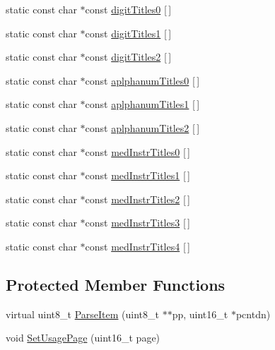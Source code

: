 \begin{DoxyCompactItemize}
\item 
static const char $\ast$const \hyperlink{class_report_desc_parser_base_a298396c59609fab20c2a5eedb3ca0b87}{digit\-Titles0} \mbox{[}$\,$\mbox{]}
\item 
static const char $\ast$const \hyperlink{class_report_desc_parser_base_abc5202f47578494d3f6008413f632873}{digit\-Titles1} \mbox{[}$\,$\mbox{]}
\item 
static const char $\ast$const \hyperlink{class_report_desc_parser_base_addaa9b5724f7d1ca10ba4ca14decd40d}{digit\-Titles2} \mbox{[}$\,$\mbox{]}
\item 
static const char $\ast$const \hyperlink{class_report_desc_parser_base_a5cd50b03ac2d022ca55e6a5bbd448ac8}{aplphanum\-Titles0} \mbox{[}$\,$\mbox{]}
\item 
static const char $\ast$const \hyperlink{class_report_desc_parser_base_afac5fab915e65babde2645e09b66e74f}{aplphanum\-Titles1} \mbox{[}$\,$\mbox{]}
\item 
static const char $\ast$const \hyperlink{class_report_desc_parser_base_ae0090afb0e090b539fcaa4b71f099b08}{aplphanum\-Titles2} \mbox{[}$\,$\mbox{]}
\item 
static const char $\ast$const \hyperlink{class_report_desc_parser_base_a3d8d0fa8512f718e8b574e4d9e8a775f}{med\-Instr\-Titles0} \mbox{[}$\,$\mbox{]}
\item 
static const char $\ast$const \hyperlink{class_report_desc_parser_base_a3e22173cfb0358f71357224f88ba7233}{med\-Instr\-Titles1} \mbox{[}$\,$\mbox{]}
\item 
static const char $\ast$const \hyperlink{class_report_desc_parser_base_aee85293ab9a08f5e348fe339f7e4e7e9}{med\-Instr\-Titles2} \mbox{[}$\,$\mbox{]}
\item 
static const char $\ast$const \hyperlink{class_report_desc_parser_base_a986eebc1d44ff6c7b2779c584640bfa8}{med\-Instr\-Titles3} \mbox{[}$\,$\mbox{]}
\item 
static const char $\ast$const \hyperlink{class_report_desc_parser_base_abf57eb862e09967eb05a234f81b4a9d4}{med\-Instr\-Titles4} \mbox{[}$\,$\mbox{]}
\end{DoxyCompactItemize}
\subsection*{\-Protected \-Member \-Functions}
\begin{DoxyCompactItemize}
\item 
virtual uint8\-\_\-t \hyperlink{class_report_desc_parser_base_ac1d6c015d9a2527bb2044e9a96fcaaf9}{\-Parse\-Item} (uint8\-\_\-t $\ast$$\ast$pp, uint16\-\_\-t $\ast$pcntdn)
\item 
void \hyperlink{class_report_desc_parser_base_a42fbc8fbccaf67eab88bd98b8d3bdd3f}{\-Set\-Usage\-Page} (uint16\-\_\-t page)
\end{DoxyCompactItemize}

